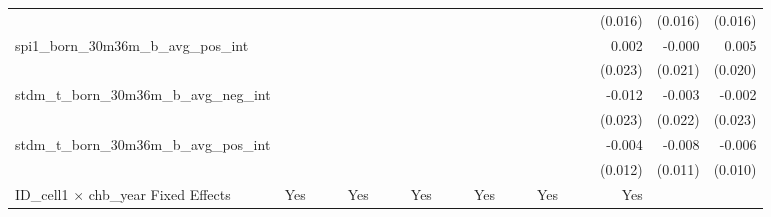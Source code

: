 \begin{tabular}{lrrrrrrrrrrrrrrrrrr}
                                            &              &              &              &              &              &              &              &              &               &              &              &               &              &              &               &      (0.016) &      (0.016) &       (0.016) \\ 
spi1\_born\_30m36m\_b\_avg\_pos\_int        &              &              &              &              &              &              &              &              &               &              &              &               &              &              &               &        0.002 &       -0.000 &         0.005 \\ 
                                            &              &              &              &              &              &              &              &              &               &              &              &               &              &              &               &      (0.023) &      (0.021) &       (0.020) \\ 
stdm\_t\_born\_30m36m\_b\_avg\_neg\_int     &              &              &              &              &              &              &              &              &               &              &              &               &              &              &               &       -0.012 &       -0.003 &        -0.002 \\ 
                                            &              &              &              &              &              &              &              &              &               &              &              &               &              &              &               &      (0.023) &      (0.022) &       (0.023) \\ 
stdm\_t\_born\_30m36m\_b\_avg\_pos\_int     &              &              &              &              &              &              &              &              &               &              &              &               &              &              &               &       -0.004 &       -0.008 &        -0.006 \\ 
                                            &              &              &              &              &              &              &              &              &               &              &              &               &              &              &               &      (0.012) &      (0.011) &       (0.010) \\ 
\midrule
ID\_cell1 $\times$ chb\_year Fixed Effects  &          Yes &              &              &          Yes &              &              &          Yes &              &               &          Yes &              &               &          Yes &              &               &          Yes &              &               \\ 

\end{tabular}
